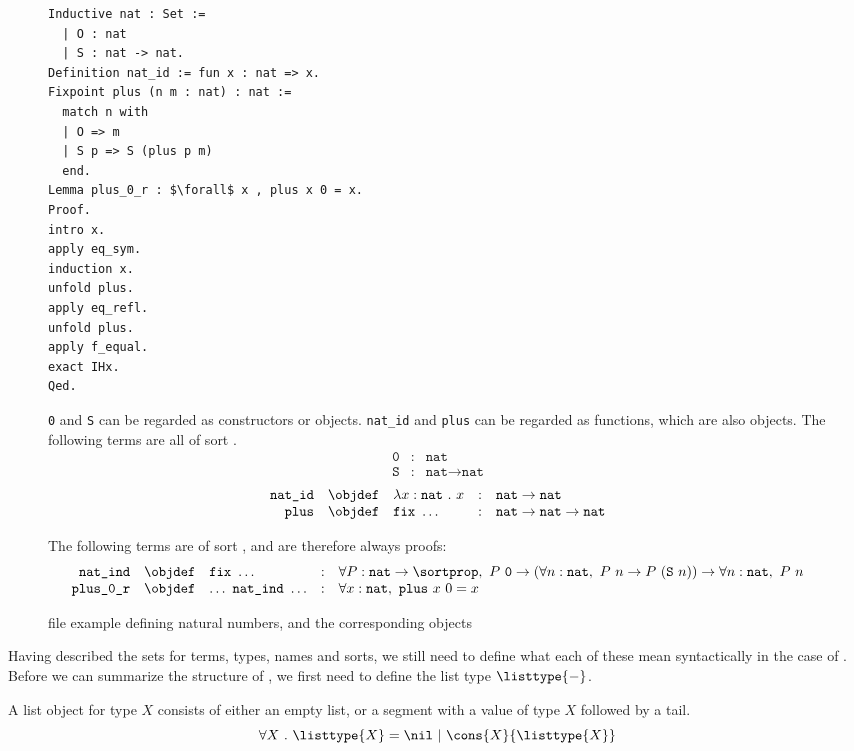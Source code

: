 \begin{figure}[H]
	\begin{lstlisting}[language=Coq, mathescape]
Inductive nat : Set :=
  | O : nat
  | S : nat -> nat.
Definition nat_id := fun x : nat => x.
Fixpoint plus (n m : nat) : nat :=
  match n with
  | O => m
  | S p => S (plus p m)
  end.
Lemma plus_0_r : $\forall$ x , plus x 0 = x.
Proof.
intro x.
apply eq_sym.
induction x.
unfold plus.
apply eq_refl.
unfold plus.
apply f_equal.
exact IHx.
Qed.
	\end{lstlisting}
	\texttt{0} and \texttt{S} can be regarded as constructors or objects. \texttt{nat\_id} and \texttt{plus} can be regarded as functions, which are also objects.
	The following terms are all of sort \sortset.
	$$
		\begin{array}{rcl}
			\texttt{0} & : & \texttt{nat} \\
			\texttt{S} & : & \texttt{nat} \rightarrow \texttt{nat}
		\end{array}
	$$
	$$
		\begin{array}{rclcl}
			\texttt{nat\_id} & \objdef & \lambda x : \texttt{nat}~.~x & : & \texttt{nat} \rightarrow \texttt{nat} \\
			\texttt{plus} & \objdef & \texttt{fix}~\ldots & : & \texttt{nat} \rightarrow \texttt{nat} \rightarrow \texttt{nat} \\
		\end{array}
	$$

	The following terms are of sort \sortprop, and are therefore always proofs:
	$$
		\begin{array}{rclcl}
			\texttt{nat\_ind} & \objdef & \texttt{fix}~\ldots & : &
				\forall P : \texttt{nat} \rightarrow \sortprop,~
				P~\texttt{0} \rightarrow (\forall n : \texttt{nat},~ P~n \rightarrow P~(\texttt{S}~n)) \rightarrow \forall n : \texttt{nat},~ P~n \\
			\texttt{plus\_0\_r} & \objdef & \ldots~\texttt{nat\_ind}~\ldots & : & \forall x : \texttt{nat},~ \texttt{plus}~x~0 = x
		\end{array}
	$$
	\caption{\coq file example defining natural numbers, and the corresponding \coq objects}
	\label{figure:natexample}
\end{figure}

Having described the sets for terms, types, names and sorts,
we still need to define what each of these mean syntactically in the case of \pcic.
Before we can summarize the structure of \pcic, we first need to define the list type $\listtype{-}$.

\begin{definition}[\listtype{-}]
	A list object for type $X$ consists of either an empty list, or a segment with a value of type $X$ followed by a tail.
	  \[ \forall X ~.~ \listtype{X} = \nil ~|~ \cons{X}{\listtype{X}} \]
  \end{definition}


